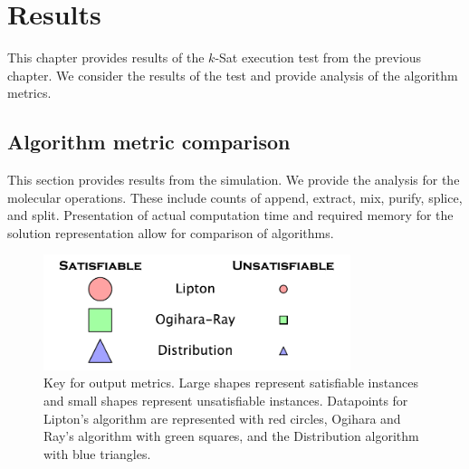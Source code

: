 \chapter{Results}

This chapter provides results of the $k$-{\sc Sat} execution test from the previous chapter.  We consider the results of the test and provide analysis of the algorithm metrics.  

	\section{Algorithm metric comparison}
	
This section provides results from the simulation.  We provide the analysis for the molecular operations.  These include counts of append, extract, mix, purify, splice, and split.  Presentation of actual computation time and required memory for the solution representation allow for comparison of algorithms.


\begin{figure}[htdp]

\begin{center}

\includegraphics[width=0.8\textwidth]{./figures/key.pdf}

\caption{Key for output metrics.  Large shapes represent satisfiable instances and small shapes represent unsatisfiable instances.  Datapoints for Lipton's algorithm are represented with red circles, Ogihara and Ray's algorithm with green squares, and the Distribution algorithm with blue triangles. }
\label{metricKey}
\end{center}
\end{figure}
\FloatBarrier

